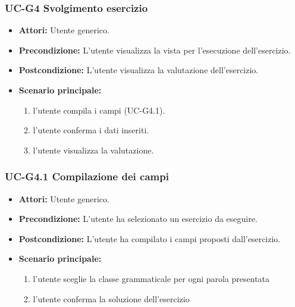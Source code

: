	\subsubsection{UC-G4 Svolgimento esercizio}
		\begin{itemize}
			\item \textbf{Attori:} Utente generico.
			\item \textbf{Precondizione:}  L'utente visualizza la vista per l'esecuzione dell'esercizio.
			\item \textbf{Postcondizione:} L'utente visualizza la valutazione dell'esercizio.
			\item \textbf{Scenario principale:}
				\begin{enumerate}
					\item l'utente compila i campi (UC-G4.1).
					\item l'utente conferma i dati inseriti.
					\item l'utente visualizza la valutazione.
				\end{enumerate}
		\end{itemize}

	\subsubsection{UC-G4.1 Compilazione dei campi}
		\begin{itemize}
			\item \textbf{Attori:} Utente generico.
			\item \textbf{Precondizione:} L'utente ha selezionato un esercizio da eseguire.
			\item \textbf{Postcondizione:} L'utente ha compilato i campi proposti dall'esercizio.
			\item \textbf{Scenario principale:}
				\begin{enumerate}
					\item l'utente sceglie la classe grammaticale per ogni parola presentata
					\item l'utente conferma la soluzione dell'esercizio
				\end{enumerate}
		\end{itemize}
		
